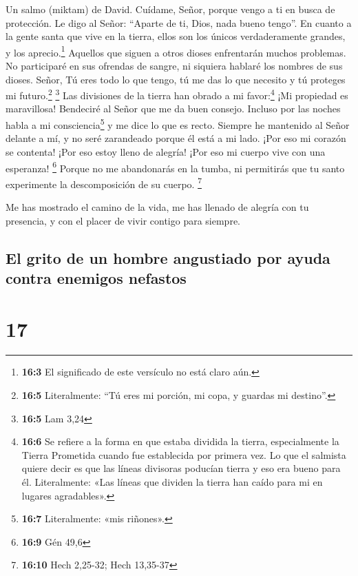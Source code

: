 Un salmo (miktam) de David.  Cuídame, Señor, porque vengo
a ti en busca de protección.  Le digo al Señor: ``Aparte
de ti, Dios, nada bueno tengo''.  En cuanto a la gente
santa que vive en la tierra, ellos son los únicos verdaderamente
grandes, y los aprecio.\footnote{\textbf{16:3} El significado de este
  versículo no está claro aún.}  Aquellos que siguen a
otros dioses enfrentarán muchos problemas. No participaré en sus
ofrendas de sangre, ni siquiera hablaré los nombres de sus dioses.
 Señor, Tú eres todo lo que tengo, tú me das lo que
necesito y tú proteges mi futuro.\footnote{\textbf{16:5} Literalmente:
  ``Tú eres mi porción, mi copa, y guardas mi destino''.} \footnote{\textbf{16:5}
  Lam 3,24}  Las divisiones de la tierra han obrado a mi
favor:\footnote{\textbf{16:6} Se refiere a la forma en que estaba
  dividida la tierra, especialmente la Tierra Prometida cuando fue
  establecida por primera vez. Lo que el salmista quiere decir es que
  las líneas divisoras poducían tierra y eso era bueno para él.
  Literalmente: «Las líneas que dividen la tierra han caído para mi en
  lugares agradables».} ¡Mi propiedad es maravillosa! 
Bendeciré al Señor que me da buen consejo. Incluso por las noches habla
a mi consciencia\footnote{\textbf{16:7} Literalmente: «mis riñones».} y
me dice lo que es recto.  Siempre he mantenido al Señor
delante a mí, y no seré zarandeado porque él está a mi lado.
 ¡Por eso mi corazón se contenta! ¡Por eso estoy lleno de
alegría! ¡Por eso mi cuerpo vive con una esperanza! \footnote{\textbf{16:9}
  Gén 49,6}  Porque no me abandonarás en la tumba, ni
permitirás que tu santo experimente la descomposición de su cuerpo.
\footnote{\textbf{16:10} Hech 2,25-32; Hech 13,35-37}

 Me has mostrado el camino de la vida, me has llenado de
alegría con tu presencia, y con el placer de vivir contigo para siempre.

\hypertarget{el-grito-de-un-hombre-angustiado-por-ayuda-contra-enemigos-nefastos}{%
\subsection{El grito de un hombre angustiado por ayuda contra enemigos
nefastos}\label{el-grito-de-un-hombre-angustiado-por-ayuda-contra-enemigos-nefastos}}

\hypertarget{section-16}{%
\section{17}\label{section-16}}

